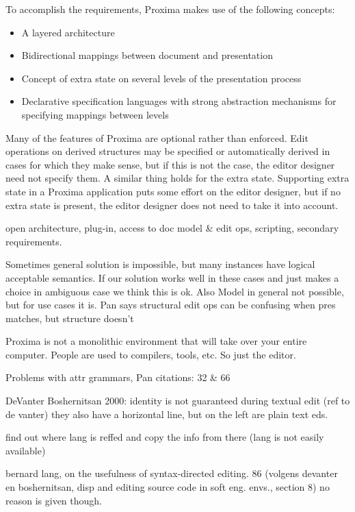 To accomplish the requirements, Proxima makes use of the following concepts:

\begin{itemize}
\item A layered architecture
\item Bidirectional mappings between document and presentation
\item Concept of extra state on several levels of the presentation process
\item Declarative specification languages with strong abstraction mechanisms for specifying mappings between levels
\end{itemize}


Many of the features of Proxima are optional rather than enforced. Edit operations on derived structures may be specified or automatically derived in cases for which they make sense, but if this is not the case, the editor designer need not specify them. A similar thing holds for the extra state. Supporting extra state in a Proxima application puts some effort on the editor designer, but if no extra state is present, the editor designer does not need to take it into account. 




\bc

 open architecture, plug-in, access to doc model & edit ops, scripting, secondary requirements.

Sometimes general solution is impossible, but many instances have logical acceptable semantics. If our solution works well in these cases and just makes a choice in ambiguous case we think this is ok. Also Model in general not possible, but for use cases it is. Pan says structural edit ops can be confusing when pres matches, but structure doesn't

Proxima is not a monolithic environment that will take over your entire computer. People are used to compilers, tools, etc. So just the editor. 


Problems with attr grammars, Pan citations: 32 \& 66


DeVanter Boshernitsan 2000: identity is not guaranteed during textual edit (ref to de vanter)
they also have a horizontal line, but on the left are plain text eds.




find out where lang is reffed and copy the info from there (lang is not easily available)

 bernard lang, on the usefulness of syntax-directed editing. 86 (volgens devanter en boshernitsan, disp and editing source code in soft eng. envs., section 8)
 no reason is given though.




